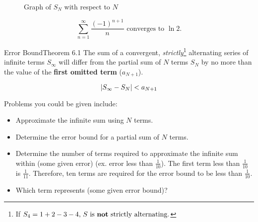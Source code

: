 \documentclass[10pt]{article}
\theoremstyle{definition}
\DeclarePairedDelimiter{\abs}{\lvert}{\rvert}
\begin{document}
\begin{figure}[h]
\centering


\caption{Graph of $S_N$ with respect to $N$}
\end{figure}

\[\sum_{n=1}^{\infty} \frac{(-1)^{n+1}}{n} \text{ converges to } \ln 2.\]

\vspace{0.5cm}

\begin{theorem}{Error Bound}{Theorem 6.1}
\hypertarget{Error Bound}{The sum of a convergent, \emph{strictly}\footnote[1]{If $S_4=1+2-3-4 \text{, $S$ is \textbf{not} strictly alternating.}$} alternating series of infinite terms $S_\infty$ will differ from the partial sum of $N$ terms $S_N$ by no more than the value of the \textbf{first omitted term} ($a_{N+1}$).}


\[\abs*{S_\infty-S_N}<a_{N+1}\]

\end{theorem}


\vspace{0.5cm}

Problems you could be given include:
\begin{itemize}
    \item Approximate the infinite sum using $N$ terms.
    \item Determine the error bound for a partial sum of $N$ terms.
    \item Determine the number of terms required to approximate the infinite sum within (some given error) (ex. error less than $\frac{1}{10}$). The first term less than $\frac{1}{10}$ is $\frac{1}{11}$. 
    \vspace{0.1cm}
    Therefore, ten terms are required for the error bound to be less than $\frac{1}{10}$.
    \item Which term represents (some given error bound)?
\end{itemize}
\end{document}
